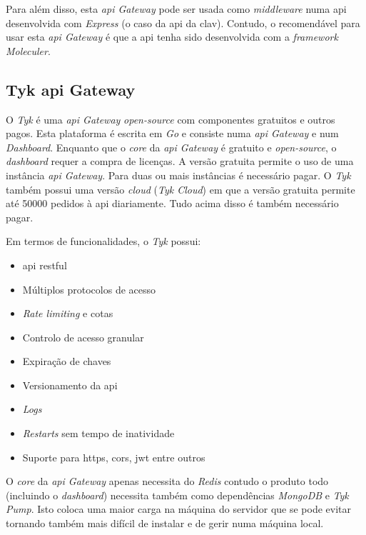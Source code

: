 Para além disso, esta \textit{\acrshort{api} Gateway} pode ser usada como \textit{middleware} numa \acrshort{api} desenvolvida com \textit{Express} (o caso da \acrshort{api} da \acrshort{clav}). Contudo, o recomendável para usar esta \textit{\acrshort{api} Gateway} é que a \acrshort{api} tenha sido desenvolvida com a \textit{framework} \textit{Moleculer}.

\subsection{Tyk \acrshort{api} Gateway}

O \textit{Tyk} é uma \textit{\acrshort{api} Gateway} \textit{open-source} com componentes gratuitos e outros pagos. Esta plataforma é escrita em \textit{Go} e consiste numa \textit{\acrshort{api} Gateway} e num \textit{Dashboard}. Enquanto que o \textit{core} da \textit{\acrshort{api} Gateway} é gratuito e \textit{open-source}, o \textit{dashboard} requer a compra de licenças. A versão gratuita permite o uso de uma instância \textit{\acrshort{api} Gateway}. Para duas ou mais instâncias é necessário pagar. O \textit{Tyk} também possui uma versão \textit{cloud} (\textit{Tyk Cloud}) em que a versão gratuita permite até 50000 pedidos à \acrshort{api} diariamente. Tudo acima disso é também necessário pagar.

Em termos de funcionalidades, o \textit{Tyk} possui:~\cite{tyk}
\begin{itemize}
    \item \acrshort{api} \acrshort{rest}ful
    \item Múltiplos protocolos de acesso
    \item \textit{Rate limiting} e cotas
    \item Controlo de acesso granular
    \item Expiração de chaves
    \item Versionamento da \acrshort{api}
    \item \textit{Logs}
    \item \textit{Restarts} sem tempo de inatividade
    \item Suporte para \acrshort{https}, \acrshort{cors}, \acrshort{jwt} entre outros
\end{itemize}

O \textit{core} da \textit{\acrshort{api} Gateway} apenas necessita do \textit{Redis} contudo o produto todo (incluindo o \textit{dashboard}) necessita também como dependências \textit{MongoDB} e \textit{Tyk Pump}. Isto coloca uma maior carga na máquina do servidor que se pode evitar tornando também mais difícil de instalar e de gerir numa máquina local.

